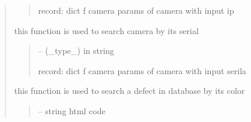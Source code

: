 \documentclass[letterpaper,10pt,english]{sphinxmanual}
\begin{document}
\begin{quote}
\begin{savenotes}
\begin{fulllineitems}
\begin{savenotes}
\begin{fulllineitems}
\begin{quote}
\begin{description}
\sphinxAtStartPar
record: dict f camera params of camera with input ip

\end{description}\end{quote}

\end{fulllineitems}\end{savenotes}


\begin{savenotes}\begin{fulllineitems}
\label{\detokenize{setting/database_utils:oxin.database_utils.dataBaseUtils.search_camera_by_serial}}
\pysigstartsignatures
{}
\pysigstopsignatures
\sphinxAtStartPar
this function is used to search camera by its serial
\begin{quote}\begin{description}
\sphinxAtStartPar
{} – (\_type\_) in string

\sphinxAtStartPar
record: dict f camera params of camera with input serila

\end{description}\end{quote}

\end{fulllineitems}\end{savenotes}


\begin{savenotes}\begin{fulllineitems}
\label{\detokenize{setting/database_utils:oxin.database_utils.dataBaseUtils.search_defect_by_color}}
\pysigstartsignatures
{}
\pysigstopsignatures
\sphinxAtStartPar
this function is used to search a defect in database by its color
\begin{quote}\begin{description}
\sphinxAtStartPar
{} – string html code


\end{description}
\end{quote}
\end{fulllineitems}
\end{savenotes}
\end{fulllineitems}
\end{savenotes}
\end{quote}
\end{document}

